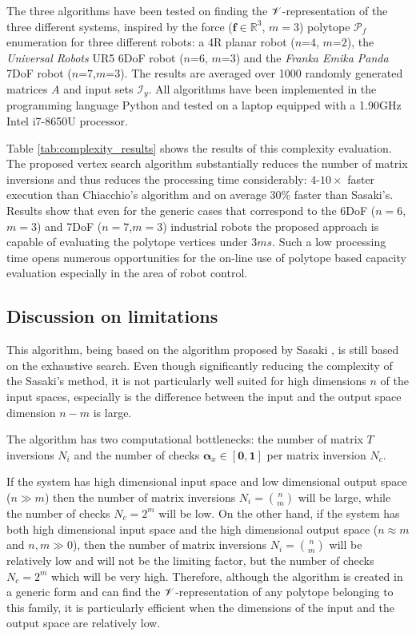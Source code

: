 The three algorithms have been tested on finding the $\mathscr{V}$-representation of the three different systems, inspired by the force ($\bm{f}\in\mathbb{R}^3$, $m=3$) polytope $\mathcal{P}_f$ enumeration for three different robots: a 4R planar robot ($n$=$4$, $m$=$2$), the \textit{Universal Robots} UR5 6DoF robot ($n$=$6$, $m$=$3$) and the \textit{Franka Emika Panda} 7DoF robot ($n$=$7$,$m$=$3$). The results are averaged over 1000 randomly generated matrices $A$ and input sets $\mathcal{I}_y$. All algorithms have been implemented in the programming language Python and tested on a laptop equipped with a 1.90GHz Intel i7-8650U processor. 

Table \ref{tab:complexity_results} shows the results of this complexity evaluation. The proposed vertex search algorithm substantially reduces the number of matrix inversions and thus reduces the processing time considerably: $4$-$10\times$ faster execution than Chiacchio's algorithm and on average 30\% faster than Sasaki's. Results show that even for the generic cases that correspond to the 6DoF ($n=6$,$m=3$) and 7DoF ($n=7$,$m=3$) industrial robots the proposed approach is capable of evaluating the polytope vertices under $3ms$. Such a low processing time opens numerous opportunities for the on-line use of polytope based capacity evaluation especially in the area of robot control.

\subsection{Discussion on limitations}
This algorithm, being based on the algorithm proposed by Sasaki \cite{sasaki2011vertex}, is still based on the exhaustive search. Even though significantly reducing the complexity of the Sasaki's method, it is not particularly well suited for high dimensions $n$ of the input spaces, especially is the difference between the input and the output space dimension $n\!-\!m$ is large. 

The algorithm has two computational bottlenecks: the number of matrix $T$ inversions $N_i$ and the number of checks $\bm{\alpha}_x \in [\bm{0},\bm{1}]$ per matrix inversion $N_c$.

If the system has high dimensional input space and low dimensional output space ($n\gg m$) then the number of matrix inversions $N_i=\binom{n}{m}$ will be large, while the number of checks $N_c=2^m$  will be low. 
On the other hand, if the system has both high dimensional input space and the high dimensional output space ($n\approx m$ and $n,m\gg0$), then the number of matrix inversions $N_i=\binom{n}{m}$ will be relatively low and will not be the limiting factor, but the number of checks $N_c=2^m$ which will be very high. Therefore, although the algorithm is created in a generic form and can find the $\mathscr{V}$-representation of any polytope belonging to this family, it is particularly efficient when the dimensions of the input and the output space are relatively low. 

